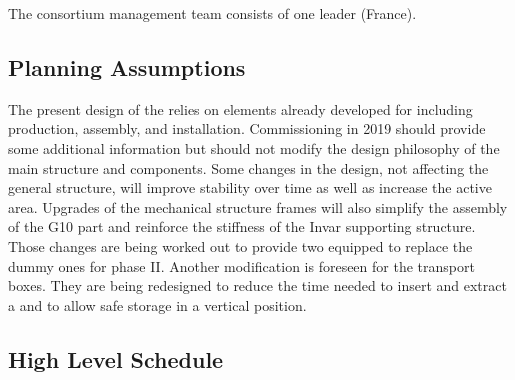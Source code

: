  The consortium management team consists of one leader (France).

\subsection{Planning Assumptions}
\label{ch:dp-crp-planning}
The present design of the  relies on elements already developed for  including production, assembly, and installation. 
Commissioning  in \num{2019} should provide some additional information but should not modify the design philosophy of the main structure and components.  Some changes in the  design, not affecting the general structure, will improve  stability over time as well as increase the active area.  Upgrades of the mechanical structure frames will also simplify the assembly of the G10 part and reinforce the stiffness of the Invar supporting structure. Those changes are being worked out to provide two equipped  to replace the dummy ones for  phase II.
Another modification is foreseen for the transport boxes. They are being redesigned to reduce the time needed to insert and extract a  and to allow safe storage in a vertical position.

\subsection{High Level Schedule}
\label{ch:dp-crp-costschedrisk}

